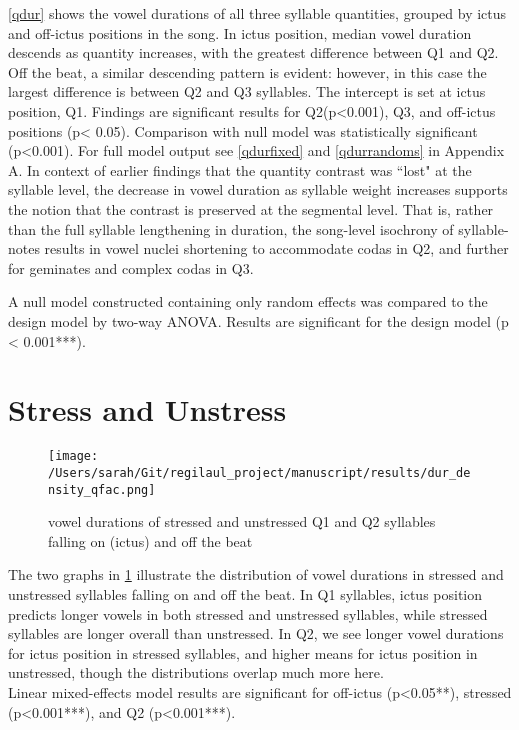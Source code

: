 \ref{qdur} shows the vowel durations of all three syllable quantities, grouped by ictus and off-ictus positions in the song. In ictus position, median vowel duration descends as quantity increases, with the greatest difference between Q1 and Q2. Off the beat, a similar descending pattern is evident: however, in this case the largest difference is between Q2 and Q3 syllables. 
 The intercept is set at ictus position, Q1. Findings are significant results for Q2(p<0.001), Q3, and off-ictus positions (p< 0.05). Comparison with null model was statistically significant (p<0.001). For full model output see \ref{qdurfixed} and \ref{qdurrandoms} in Appendix A. In context of earlier findings that the quantity contrast was ``lost" at the syllable level, the decrease in vowel duration as syllable weight increases supports the notion that the contrast is preserved at the segmental level. That is, rather than the full syllable lengthening in duration, the song-level isochrony of syllable-notes results in vowel nuclei shortening to accommodate codas in Q2, and further for geminates and complex codas in Q3. 
 
 
A null model constructed containing only random effects was compared to the design model by two-way ANOVA. Results are significant for the design model (p < 0.001***).


\section{Stress and Unstress}

\begin{figure}[ht]
\centering
\texttt{[image: /Users/sarah/Git/regilaul\_project/manuscript/results/dur\_density\_qfac.png]}
\caption{vowel durations of stressed and unstressed Q1 and Q2 syllables falling on (ictus) and off the beat}
\label{durstrick}
\end{figure}

The two graphs in \ref{durstrick} illustrate the distribution of vowel durations in stressed and unstressed syllables falling on and off the beat. In Q1 syllables, ictus position predicts longer vowels in both stressed and unstressed syllables, while stressed syllables are longer overall than unstressed. In Q2, we see longer vowel durations for ictus position in stressed syllables, and higher means for ictus position in unstressed, though the distributions overlap much more here. \\

Linear mixed-effects model results are significant for off-ictus (p<0.05**), stressed (p<0.001***), and Q2 (p<0.001***). 

